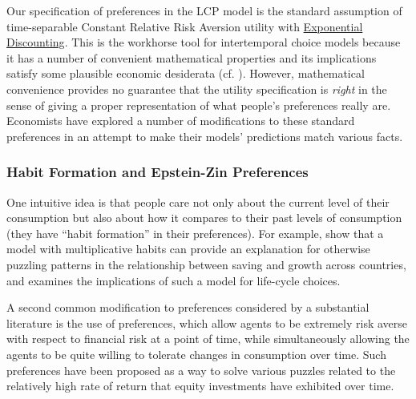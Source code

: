 \documentclass[12pt,letterpaper, fleqn]{article}
\begin{document}
Our specification of preferences in the LCP model is the standard assumption of time-separable Constant Relative Risk Aversion utility with \href{https://en.wikipedia.org/wiki/Exponential\_discounting}{Exponential Discounting}.
This is the workhorse tool for intertemporal choice models because it has a number of convenient mathematical properties and its implications satisfy some plausible economic desiderata (cf. \cite{kimballStandardRA}).
However, mathematical convenience provides no guarantee that the utility specification is \textit{right} in the sense of giving a proper representation of what people's preferences really are.
Economists have explored a number of modifications to these standard preferences in an attempt to make their models' predictions match various facts.

\subsubsection{Habit Formation and Epstein-Zin Preferences}

One intuitive idea is that people care not only about the current level of their consumption but also about how it compares to their past levels of consumption (they have ``habit formation'' in their preferences).
For example, \cite{Carroll_2000} show that a model with multiplicative habits can provide an explanation for otherwise puzzling patterns in the relationship between saving and growth across countries, and
\cite{Michaelides_2002} examines the implications of such a model for life-cycle choices.

A second common modification to preferences considered by a substantial literature is the use of \cite{Epstein_1991} preferences, which allow agents to be extremely risk averse with respect to financial risk at a point of time, while simultaneously allowing the agents to be quite willing to tolerate changes in consumption over time.
Such preferences have been proposed as a way to solve various puzzles related to the relatively high rate of return that equity investments have exhibited over time.
\end{document}
